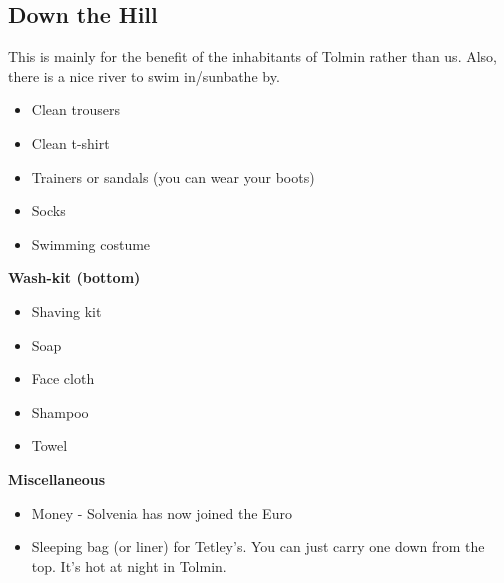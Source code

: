 \subsection{Down the Hill}
This is mainly for the benefit of the inhabitants of Tolmin rather than us. Also, there is a nice river to swim in/sunbathe by.
\begin{itemize}
    \item Clean trousers
    \item Clean t-shirt
    \item Trainers or sandals (you can wear your boots)
    \item Socks
    \item Swimming costume
\end{itemize}

\textbf{Wash-kit (bottom)}
\begin{itemize}
    \item Shaving kit
    \item Soap
    \item Face cloth
    \item Shampoo
    \item Towel
\end{itemize}

\textbf{Miscellaneous}
\begin{itemize}
    \item Money - Solvenia has now joined the Euro
    \item Sleeping bag (or liner) for Tetley’s. You can just carry one down from the top. It's hot at night in Tolmin.
\end{itemize}


